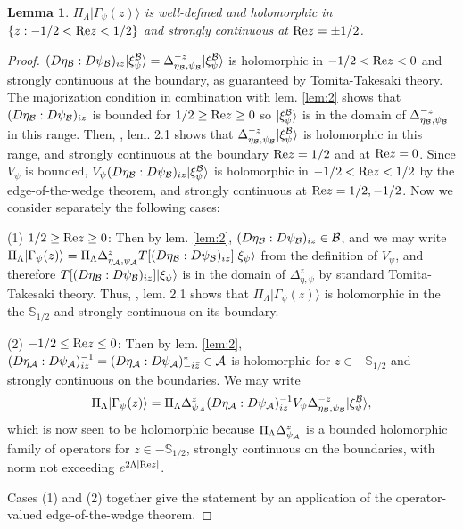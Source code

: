 \documentclass[english,a4paper,12pt]{article}
\newtheorem{lemma}{Lemma}
\def\bS{{\mathbb S}}
\def\cA{{\mathfrak A}}
\def\cB{{\mathfrak B}}
\newcommand{\ca}[1]{{\cal #1}}
\newcommand{\ben}{\begin{equation}}
\newcommand{\een}{\end{equation}}
\def\cA{{\ca A}}
\def\cB{{\ca B}}
\renewcommand{\Re}{{\rm Re}}
\begin{document}
\begin{lemma}\label{lem:5}
$\Pi_\Lambda |\Gamma_{\psi}(z)\rangle$ is well-defined and holomorphic in $\{z: -1/2<\Re z<1/2\}$ and strongly continuous at $\Re z=\pm 1/2$.
\end{lemma}
\begin{proof}
$(D\eta_\cB:D\psi_\cB)_{iz} |\xi_{\psi}^{\cB}\rangle = \Delta_{\eta_\cB,\psi_\cB}^{-z} |\xi_{\psi}^{\cB}\rangle$
is holomorphic in $-1/2<\Re z<0$ and strongly continuous at the boundary, 
as guaranteed by Tomita-Takesaki theory. The majorization condition 
in combination with lem. \ref{lem:2} shows that $(D\eta_\cB:D\psi_\cB)_{iz}$  is bounded 
for $1/2 \ge \Re z \ge 0$ so $ |\xi_{\psi}^{\cB}\rangle $ is in the domain of $\Delta_{\eta_\cB,\psi_\cB}^{-z}$ in this range. 
Then, \cite{CecchiniPetz}, lem. 2.1 shows that $\Delta_{\eta_\cB,\psi_\cB}^{-z} |\xi_{\psi}^{\cB}\rangle$ is holomorphic in this range, 
and strongly continuous at the boundary $\Re z=1/2$ and at $\Re z=0$.
Since $V_\psi$ is bounded, $V_\psi (D\eta_\cB:D\psi_\cB)_{iz} |\xi_{\psi}^{\cB}\rangle$
is holomorphic in $-1/2<\Re z<1/2$ by the edge-of-the-wedge theorem, and strongly continuous at $\Re z=1/2, -1/2$. 
Now we consider separately the following cases: 

(1)
$1/2 \ge \Re z \ge 0$: Then by lem. \ref{lem:2}, $(D\eta_\cB:D\psi_\cB)_{iz}  \in \cB$,
 and we may write 
$\Pi_\Lambda |\Gamma_{\psi}(z)\rangle
=\Pi_\Lambda \Delta_{\eta_\cA,\psi_\cA}^{z} T[(D\eta_\cB:D\psi_\cB)_{iz}] |\xi_{\psi}\rangle$
from the definition of $V_\psi$, and therefore $T[(D\eta_\cB:D\psi_\cB)_{iz}] |\xi_{\psi}\rangle$ is 
in the domain of $\Delta_{\eta,\psi}^{z} $ by standard Tomita-Takesaki theory. Thus, \cite{CecchiniPetz}, lem. 2.1 shows that
$\Pi_\Lambda |\Gamma_{\psi}(z)\rangle$ is holomorphic in the the $\bS_{1/2}$ and strongly continuous on its boundary.

(2) $-1/2\le \Re z\le 0$: Then by lem. \ref{lem:2}, $(D\eta_\cA:D\psi_\cA)_{iz}^{-1} = (D\eta_\cA:D\psi_\cA)_{-i\bar z}^* \in \cA$ is holomorphic 
for $z \in -\bS_{1/2}$ 
and strongly continuous on the boundaries. We may write 
\ben
\Pi_\Lambda |\Gamma_{\psi}(z)\rangle= \Pi_\Lambda \Delta_{\psi_\cA}^{z} (D\eta_\cA:D\psi_\cA)_{iz}^{-1} V_\psi 
\Delta_{\eta_\cB, \psi_\cB}^{-z} |\xi_{\psi}^{\cB}\rangle,
\een 
which is now seen to be holomorphic because 
$\Pi_\Lambda \Delta_{\psi_\cA}^{z}$ is a bounded holomorphic family of operators for $z \in -\bS_{1/2}$, strongly continuous on the boundaries, 
with norm not exceeding $e^{2\Lambda |\Re z|}$. 

Cases (1) and (2) together give the statement by an application of the operator-valued edge-of-the-wedge theorem. 
\end{proof}
\end{document}
